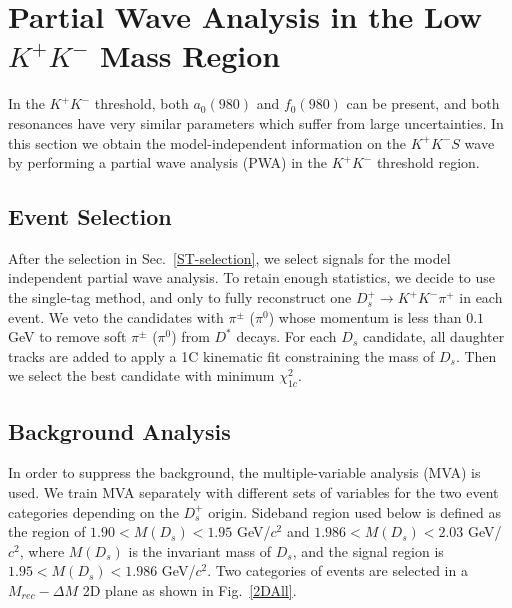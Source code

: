 \section{Partial Wave Analysis in the Low $K^{+}K^{-}$ Mass Region}
\label{MIPWA}
\par{In the $K^{+}K^{-}$ threshold, both $a_{0}(980)$ and $f_{0}(980)$ can be present, and both resonances have very similar parameters which suffer from large uncertainties. 
In this section we obtain the model-independent information on the $K^{+}K^{-} S$ wave by performing a partial wave analysis (PWA) in the  $K^{+}K^{-}$ threshold region.}
\subsection{Event Selection}
\label{MIPWASelection}
\par{
    After the selection in Sec.~\ref{ST-selection}, we select signals for the model independent partial wave analysis.
    To retain enough statistics, we decide to use the single-tag method, and only to fully reconstruct one $D_{s}^{+} \rightarrow K^{+}K^{-}\pi^{+}$ in each event. 
We veto the candidates with $\pi^{\pm}$ ($\pi^{0}$) whose momentum is less than $0.1$ GeV to remove soft $\pi^{\pm}$ ($\pi^{0}$) from $D^{*}$ decays.
For each $D_{s}$ candidate, all daughter tracks are added to apply a 1C kinematic fit constraining the mass of $D_{s}$. 
Then we select the best candidate with minimum $\chi_{1c}^{2}$.
}
\subsection{Background Analysis}
\label{MIPWA-BA}
In order to suppress the background, the multiple-variable analysis (MVA) is used. We train MVA separately with different sets of variables for the two event categories depending on the $D_{s}^{+}$ origin. 
Sideband region used below is defined as the region of  $1.90 < M(D_{s}) < 1.95$ GeV/$c^{2}$ and   $1.986 < M(D_{s}) < 2.03$ GeV/$c^{2}$, where $M(D_{s})$ is the invariant mass of $D_{s}$, and the signal region is $1.95 < M(D_{s}) < 1.986$ GeV/$c^{2}$.
Two categories of events are selected in a $M_{rec}-\Delta{M}$ 2D plane as shown in Fig.~\ref{2DAll}.




